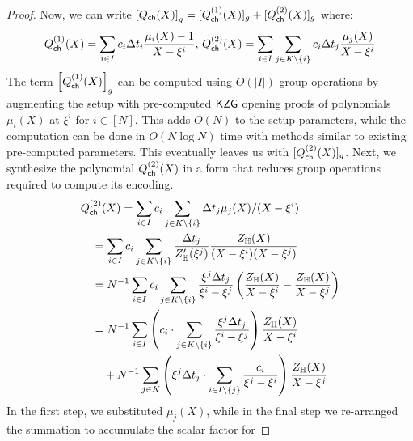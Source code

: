 \begin{proof}
    Now, we can write $\left[{Q_{\mathsf{ch}}({X})}\right]_g=[Q^{(1)}_{\mathsf{ch}}({X})]_g + [Q^{(2)}_{\mathsf{ch}}({X})]_g$ where:
        {
    \begin{gather*}
        Q^{(1)}_{\mathsf{ch}}({X})=\sum_{i\in I}c_i\Delta t_i\frac{\mu_i(X)-1}{X-\xi^i},\,
        Q^{(2)}_{\mathsf{ch}}({X})=\sum_{i\in I}\sum_{j\in K\setminus \{i\}} c_i\Delta t_j\frac{\mu_j(X)}{X-\xi^i}
    \end{gather*}
    }
    The term $\left[{Q^{(1)}_{\mathsf{ch}}({X})}\right]_g$ can be computed using $O(|I|)$ group operations by augmenting the setup with pre-computed
    $\mathsf{KZG}$ opening proofs of polynomials $\mu_i(X)$ at $\xi^i$ for $i\in [N]$. This adds $O(N)$ to the setup parameters, while the computation
    can be done in $O(N\log N)$ time with methods similar to existing pre-computed parameters. This eventually leaves us with $[Q^{(2)}_{\mathsf{ch}}({X})]_g$.
    Next, we synthesize the polynomial $Q^{(2)}_{\mathsf{ch}}({X})$ in a form that reduces group operations required to compute its encoding.
    \begin{align}\label{eq:Qcachepoly2}
    &Q^{(2)}_{\mathsf{ch}}({X}) = \sum_{i\in I}c_i\sum_{j\in K\setminus \{i\}} \Delta t_j\mu_j(X)/(X-\xi^i) \nonumber \\
    &\quad = \sum_{i\in I}c_i\sum_{j\in K\setminus \{i\}}\frac{\Delta t_j}{Z_{\mathbb{H}}'(\xi^j)} \frac{Z_{\mathbb{H}}(X)}{(X-\xi^i)(X-\xi^j)} \nonumber \\
    &\quad = N^{-1}\sum_{i\in I}c_i\sum_{j\in K\setminus \{i\}}\frac{\xi^j\Delta t_j}{\xi^i-\xi^j}
    \left(\frac{Z_{\mathbb{H}}(X)}{X-\xi^i} - \frac{Z_{\mathbb{H}}(X)}{X-\xi^j}\right) \nonumber \\
    &\quad = N^{-1}\sum_{i\in I}\left(c_i\cdot \sum_{j\in K\setminus \{i\}} \frac{\xi^j\Delta t_j}{\xi^i-\xi^j}\right)\frac{Z_{\mathbb{H}}(X)}{X-\xi^i} \nonumber \\
    &\qquad + N^{-1} \sum_{j\in K}\left(\xi^j\Delta t_j\cdot \sum_{i\in I\setminus \{j\}}\frac{c_i}{\xi^j-\xi^i}\right)\frac{Z_{\mathbb{H}}(X)}{X-\xi^j}
    \end{align}
    In the first step, we substituted $\mu_j(X)$, while in the final step we re-arranged the summation to accumulate the scalar factor for

\end{proof}
